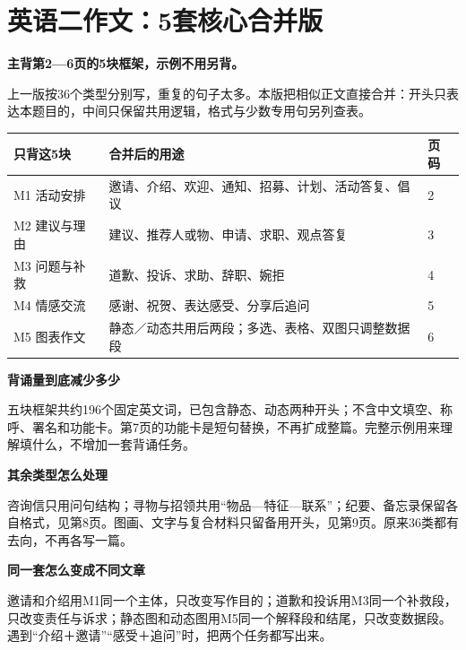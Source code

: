 \documentclass[11pt,a4paper,fontset=macnew]{ctexart}
\begin{document}
\section*{英语二作文：5套核心合并版}
{\large\bfseries 主背第2—6页的5块框架，示例不用另背。}\par
\vspace{4pt}
上一版按36个类型分别写，重复的句子太多。本版把相似正文直接合并：开头只表达本题目的，中间只保留共用逻辑，格式与少数专用句另列查表。

\begin{longtable}{L{34mm}L{107mm}L{12mm}}\toprule
\textbf{只背这5块} & \textbf{合并后的用途} & \textbf{页码}\\\midrule\endhead
M1 活动安排 & 邀请、介绍、欢迎、通知、招募、计划、活动答复、倡议 & 2\\
M2 建议与理由 & 建议、推荐人或物、申请、求职、观点答复 & 3\\
M3 问题与补救 & 道歉、投诉、求助、辞职、婉拒 & 4\\
M4 情感交流 & 感谢、祝贺、表达感受、分享后追问 & 5\\
M5 图表作文 & 静态／动态共用后两段；多选、表格、双图只调整数据段 & 6\\
\bottomrule\end{longtable}
\par\vspace{5pt}\noindent\textbf{背诵量到底减少多少}\par\nopagebreak
五块框架共约196个固定英文词，已包含静态、动态两种开头；不含中文填空、称呼、署名和功能卡。第7页的功能卡是短句替换，不再扩成整篇。完整示例用来理解填什么，不增加一套背诵任务。

\par\vspace{5pt}\noindent\textbf{其余类型怎么处理}\par\nopagebreak
咨询信只用问句结构；寻物与招领共用“物品—特征—联系”；纪要、备忘录保留各自格式，见第8页。图画、文字与复合材料只留备用开头，见第9页。原来36类都有去向，不再各写一篇。

\par\vspace{5pt}\noindent\textbf{同一套怎么变成不同文章}\par\nopagebreak
邀请和介绍用M1同一个主体，只改变写作目的；道歉和投诉用M3同一个补救段，只改变责任与诉求；静态图和动态图用M5同一个解释段和结尾，只改变数据段。遇到“介绍＋邀请”“感受＋追问”时，把两个任务都写出来。
\end{document}
